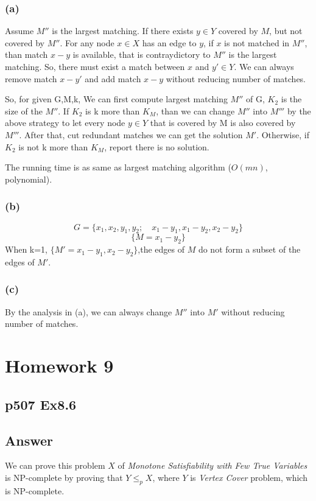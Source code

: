 \documentclass[a4paper]{article}
\begin{document}
\subsubsection*{(a)}
Assume $M''$ is the largest matching. If there exists $y\in Y$ covered by $M$, but not covered by $M''$. For any node $x\in X$ has an edge to $y$, if $x$ is not matched in $M''$, than match $x-y$ is available, that is contraydictory to $M''$ is the largest matching. So, there must exist a match between $x$ and $y'\in Y$. We can always remove match $x-y'$ and add match $x-y$ without reducing number of matches.

So, for given G,M,k, We can first compute largest matching $M''$ of G, $K_2$ is the size of the $M''$. If $K_2$ is k more than $K_M$, than we can change $M''$ into $M'''$ by the above strategy to let every node $y \in Y$ that is covered by M is also covered by $M'''$. After that, cut redundant matches we can get the solution $M'$. Otherwise, if $K_2$ is not k more than $K_M$, report there is no solution.

The running time is as same as largest matching algorithm ($O(mn)$, polynomial).

\subsubsection*{(b)}
$$G = \{x_1,x_2,y_1,y_2; \quad x_1-y_1,x_1-y_2,x_2-y_2\}$$
$$\{M=x_1-y_2\}$$
When k=1, $\{M'=x_1-y_1,x_2-y_2\}$,the edges of $M$ do
not form a subset of the edges of $M'$.

\subsubsection*{(c)}
By the analysis in (a), we can always change $M''$ into $M'$ without reducing number of matches.


\newpage
\section*{Homework 9}
\subsection*{p507 Ex8.6}
\subsection*{Answer}
We can prove this problem $X$ of \emph{Monotone Satisfiability with Few True Variables} is NP-complete by proving that $Y\leq_pX$, where $Y$ is \emph{Vertex Cover} problem, which is NP-complete.
\end{document}

